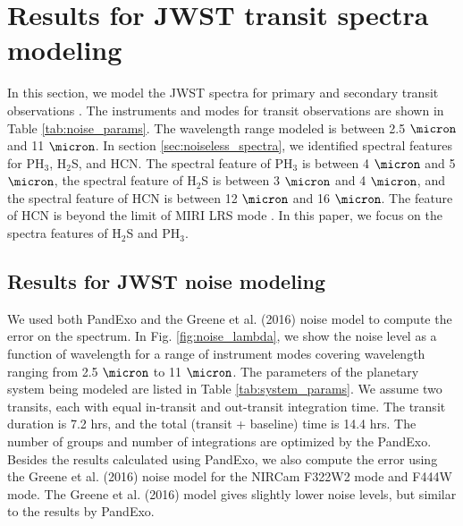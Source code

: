 \documentclass[twocolumn]{aastex61}
\begin{document}
\section{Results for JWST transit spectra modeling}\label{sec:noise_spectra}

In this section, we model the JWST spectra for primary and secondary transit observations . The instruments and modes for transit observations are shown in Table \ref{tab:noise_params}. The wavelength range modeled is between 2.5 $\micron$ and 11 $\micron$. In section \ref{sec:noiseless_spectra}, we identified spectral features for PH$_3$, H$_2$S, and HCN. The spectral feature of PH$_3$ is between 4 $\micron$ and 5 $\micron$, the spectral feature of H$_2$S is between 3 $\micron$ and 4 $\micron$, and the spectral feature of HCN is between 12 $\micron$ and 16 $\micron$. The feature of HCN is beyond the limit of MIRI LRS mode \citep{Beichman14}. In this paper, we focus on the spectra features of H$_2$S and PH$_3$. 

\subsection{Results for JWST noise modeling}

We used both PandExo and the Greene et al. (2016) noise model to compute the error on the spectrum. In Fig. \ref{fig:noise_lambda}, we show the noise level as a function of wavelength for a range of instrument modes covering wavelength ranging from 2.5 $\micron$ to 11 $\micron$. The parameters of the planetary system being modeled are listed in Table \ref{tab:system_params}. We assume two transits, each with equal in-transit and out-transit integration time. The transit duration is 7.2 hrs, and the total (transit + baseline) time is 14.4 hrs. The number of groups and number of integrations are optimized by the PandExo. Besides the results calculated using PandExo, we also compute the error using the Greene et al. (2016) noise model for the NIRCam F322W2 mode and F444W mode. The Greene et al. (2016) model gives slightly lower noise levels, but similar to the results by PandExo.
\end{document}
